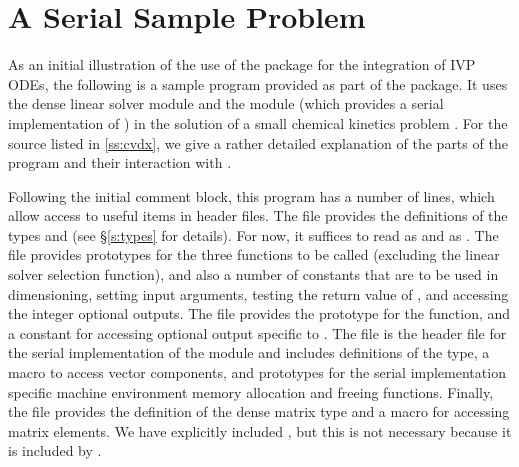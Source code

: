 
\section{A Serial Sample Problem}\label{ss:serial_sim_ex}

As an initial illustration of the use of the {\cvodes} package for the
integration of IVP ODEs, the following is a sample program provided as part 
of the package.  It uses the {\cvodes} dense linear solver module {\cvdense} 
and the {\nvecs} module (which provides a serial implementation of {\nvector})
in the solution of a small chemical kinetics problem
.
For the source listed in \A\ref{ss:cvdx}, we give a rather detailed explanation of 
the parts of the program and their interaction with {\cvodes}.

Following the initial comment block, this program has a number
of  lines, which allow access to useful items in {\cvodes}
header files.  The  file provides the definitions of the
types  and  (see \S\ref{s:types} for
details).  For now, it suffices to read  as  and
 as .
The  file provides prototypes for the three {\cvodes}
functions to be called (excluding the linear solver selection
function), and also a number of constants that are to be used in
dimensioning, setting input arguments, testing the return value of
, and accessing the integer optional outputs.
The  file provides the prototype for the  
function, and a constant  for accessing optional output 
specific to {\cvdense}.  
The  file is the header file for the serial implementation
of the {\nvector} module and includes definitions of the 
 type, a macro to access vector components, and prototypes 
for the serial implementation specific machine environment memory allocation
and freeing functions.
Finally, the  file provides the definition of the dense
matrix type  and a macro for accessing matrix elements.
We have explicitly included , but this is not necessary because 
it is included by .

